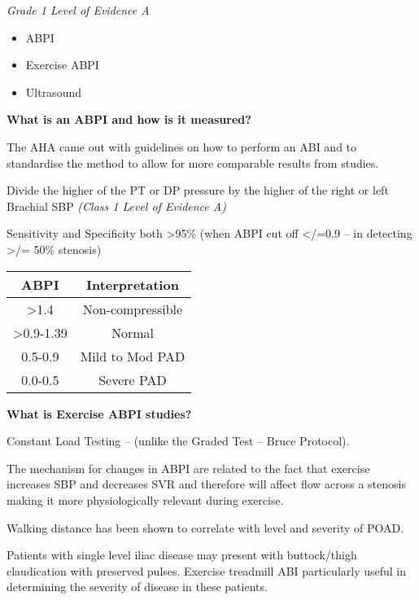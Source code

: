 \documentclass[
]{book}
\begin{document}
\emph{Grade 1 Level of Evidence A}

\begin{itemize}
\item
  ABPI
\item
  Exercise ABPI
\item
  Ultrasound
\end{itemize}

\textbf{What is an ABPI and how is it measured?}

The AHA came out with guidelines on how to perform an ABI and to
standardise the method to allow for more comparable results from
studies.

Divide the higher of the PT or DP pressure by the higher of the right or
left Brachial SBP \emph{(Class 1 Level of Evidence A)}
\citep{aboyansMeasurementInterpretationAnkleBrachial2012}

Sensitivity and Specificity both \textgreater95\% (when ABPI cut off \textless/=0.9 -- in
detecting \textgreater/= 50\% stenosis) \citep{yaoAnkleSystolicPressure2005, ourielCriticalEvaluationStress1982}

\begin{longtable}[]{@{}cc@{}}
\toprule()
\textbf{ABPI} & Interpretation \\
\midrule()
\endhead
\textgreater1.4 & Non-compressible \\
\textgreater0.9-1.39 & Normal \\
0.5-0.9 & Mild to Mod PAD \\
0.0-0.5 & Severe PAD \\
\bottomrule()
\end{longtable}

\textbf{What is Exercise ABPI studies?}

Constant Load Testing -- (unlike the Graded Test -- Bruce Protocol).

The mechanism for changes in ABPI are related to the fact that exercise
increases SBP and decreases SVR and therefore will affect flow across a
stenosis making it more physiologically relevant during exercise.
\citep{nicolaiReliabilityTreadmillTesting2009, alqahtaniPredictorsChangeAnkleBrachial2018}

Walking distance has been shown to correlate with level and severity of
POAD. \citep{strandnessHemodynamicsSurgeons1975a}

Patients with single level iliac disease may present with buttock/thigh
claudication with preserved pulses. Exercise treadmill ABI particularly
useful in determining the severity of disease in these patients.
\citep{aboyansGeneralPrognosisPatients2010}
\end{document}

